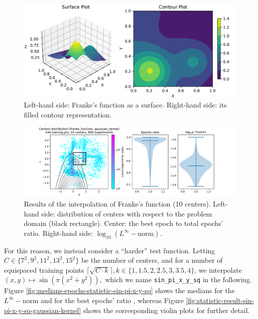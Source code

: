 \documentclass[12pt]{report} %
\begin{document}
\begin{figure}[ht]
  \includegraphics[width=.8\textwidth]{imagenes/experiments/2d/franke_interpolation/Franke_Function_Surface_Contour.pdf}
  \caption{Left-hand side: Franke's function as a surface. Right-hand side:
    its filled contour representation.}
  \label{fig:franke-function-surface-contour}
\end{figure}


\begin{figure}[h]
  \includegraphics[width=\textwidth, trim={2cm 0 2.8cm 0}, clip=true]{imagenes/experiments/2d/franke_interpolation/tr12_c10_franke_function_gaussian_kernel.pdf}
  \caption{Results of the interpolation of Franke's function (10 centers).
    Left-hand side: distribution of centers with respect to the problem domain (black rectangle). Center: the best epoch to total epochs' ratio.
    Right-hand side: $\log_{10}(L^\infty-\text{norm})$.}
  \label{fig:franke-tr12-c10}
\end{figure}

For this reason, we instead consider a ``harder'' test function. Letting $C\in\{7^2,9^2,11^2,13^2,15^2\}$ be the number of centers, and for a number of equispaced training points $ \lceil \sqrt{C \cdot k} \rceil, k \in \{1,1.5,2,2.5,3,3.5,4\}$, we interpolate $(x,y)\mapsto \sin(\pi(x^2+y^2)),$ which we name \texttt{sin\_pi\_x\_y\_sq} in the following. Figure \ref{fig:medians-epochs-statistic-sin-pi-x-y-sq} shows the medians for the $L^\infty-$norm and for the best epochs' ratio
, whereas Figure \ref{fig:statistic-result-sin-pi-x-y-sq-gaussian-kernel} shows the corresponding violin plots for further detail. 
\end{document}
